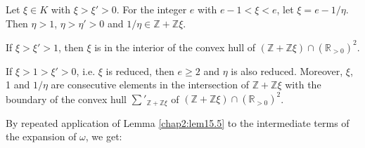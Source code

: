 \setcounter{lemma}{4}
  \begin{lemma}\label{chap2:lem15.5}%
Let $\xi \in K$ with $\xi > \xi'>0$. For the integer $e$ with $e-1< \xi
<e$, let $\xi =e-1/\eta$. Then $\eta >1$, $\eta > \eta'>0$ and $1/\eta \in
\mathbb{Z}+\mathbb{Z}\xi$. 

\noindent
If $\xi > \xi' > 1$, then $\xi$ is in the interior of the convex hull
of $(\mathbb{Z}+ \mathbb{Z}\xi) \cap (\mathbb{R}_{>0})^2$. 
\end{lemma}

\noindent
If $\xi >1> \xi' >0$, i.e. $\xi$ is reduced, then $e \ge 2$ and $\eta$
is also reduced. Moreover, $\xi$, 1 and $1/ \eta$ are consecutive
elements in the intersection of $\mathbb{Z}+\mathbb{Z} \xi$ with the
boundary of the convex hull $\sum'_{\mathbb{Z}+\mathbb{Z}\xi}$ of
$(\mathbb{Z}+\mathbb{Z}\xi) \cap (\mathbb{R}_{>0})^2$. 

By repeated application of Lemma \ref{chap2:lem15.5} to the
intermediate terms of the expansion of $\omega$, we get:  
 
